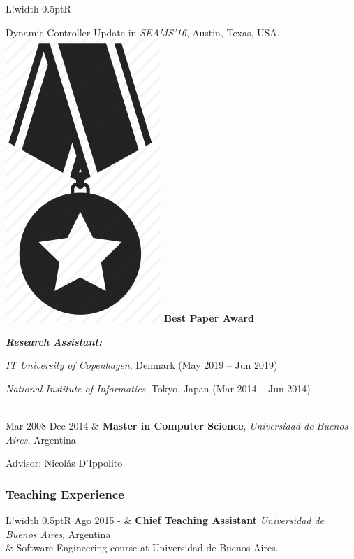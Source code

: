 \documentclass[10pt]{article}
\newcommand\VRule{\color{lightgray}\vrule width 0.5pt}
\begin{document}
\begin{tabular}{L!{\VRule}R}
\begin{compactitem}
{			Dynamic Controller Update} in \textit{SEAMS'16}, Austin, Texas, 
			USA. 
			\includegraphics[scale=0.022]{../img/medal.png}
		\textbf{Best Paper Award}
	\end{compactitem}
	\textit{\textbf{Research Assistant:}}
	\begin{compactitem}
\item \textit{IT University of 	Copenhagen}, Denmark (May 2019 -- Jun 2019)
\item \textit{National Institute of Informatics}, Tokyo, Japan (Mar 2014 -- Jun 
2014)
	\end{compactitem}
	\\
	Mar 2008 Dec 2014 & \textbf{Master in Computer Science}, 
	\textit{Universidad de Buenos Aires}, Argentina
	
	Advisor: Nicol\'as D'Ippolito \\
\end{tabular}



\subsubsection*{Teaching Experience}

\begin{tabular}{L!{\VRule}R}
	Ago 2015 - & \textbf{Chief Teaching Assistant} \textit{Universidad de 
		Buenos 
		Aires}, Argentina\\
	& Software Engineering course at Universidad de Buenos Aires.\\
\end{tabular}
\end{document}
